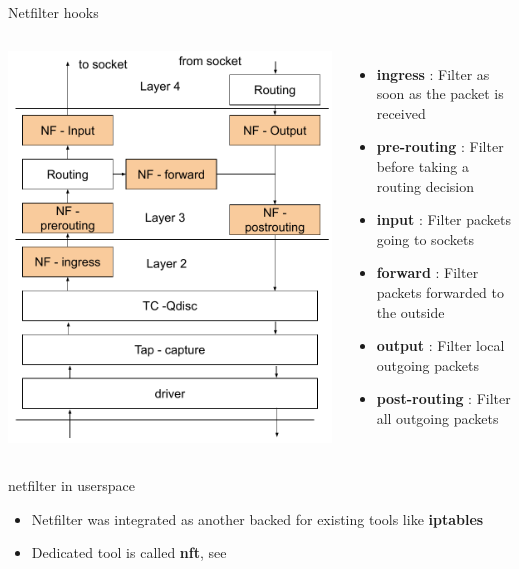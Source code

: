 \begin{frame}{Netfilter hooks}
	\begin{columns}
		\includegraphics[width=1\textwidth]{slides/networking-filtering/routing_nf.pdf}
		\begin{itemize}
			\item \textbf{ingress} : Filter as soon as the packet is received
			\item \textbf{pre-routing} : Filter before taking a routing decision
			\item \textbf{input} : Filter packets going to sockets
			\item \textbf{forward} : Filter packets forwarded to the outside
			\item \textbf{output} : Filter local outgoing packets
			\item \textbf{post-routing} : Filter all outgoing packets
		\end{itemize}
	\end{columns}
\end{frame}

\begin{frame}{netfilter in userspace}
	\begin{itemize}
		\item Netfilter was integrated as another backed for existing tools like \textbf{iptables}
		\item Dedicated tool is called \textbf{nft}, see 
	\end{itemize}
\end{frame}



